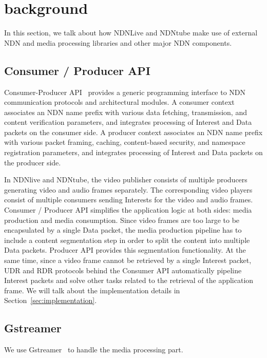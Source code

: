 \section{background} %
In this section, we talk about how NDNLive and NDNtube make use of external NDN and media processing libraries and other major NDN components. 

\label{sec:background}
\subsection{Consumer / Producer API}
\label{ssub:cpapi}
Consumer-Producer API~\cite{api-tr} provides a generic programming interface to NDN communication protocols and architectural modules. A consumer context associates an NDN name prefix with various data fetching, transmission, and content verification parameters, and integrates processing of Interest and Data packets on the consumer side. A producer context associates an NDN name prefix with various packet framing, caching, content-based security, and namespace registration parameters, and integrates processing of Interest and Data packets on the producer side.

In NDNlive and NDNtube, the video publisher consists of multiple producers generating video and audio frames separately. The corresponding video players consist of multiple consumers sending Interests for the video and audio frames. Consumer / Producer API simplifies the application logic at both sides: media production and media consumption. Since video frames are too large to be encapsulated by a single Data packet, the media production pipeline has to include a content segmentation step in order to split the content into multiple Data packets. Producer API provides this segmentation functionality. At the same time, since a video frame cannot be retrieved by a single Interest packet, UDR and RDR protocols behind the Consumer API automatically pipeline Interest packets and solve other tasks related to the retrieval of the application frame. 
We will talk about the implementation details in Section~\ref{sec:implementation}.

\subsection{Gstreamer}

We use Gstreamer~\cite{gstreamer} to handle the media processing part. 

